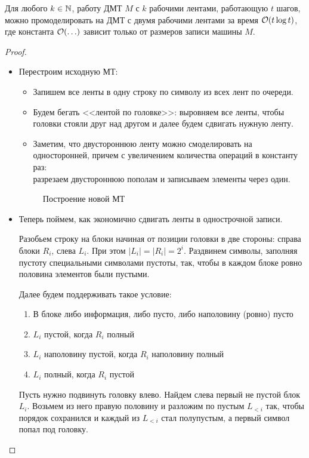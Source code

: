 \begin{thm}\label{th:two_bands}
	Для любого $ k \in \mathbb{N}$, работу ДМТ  $ M$ с $ k$ рабочими лентами, работающую $ t$ шагов, можно  промоделировать на  ДМТ с двумя рабочими лентами за время  $ \mathcal{O}(t \log t)$,
	где константа $ \mathcal{O}(\ldots) $ зависит только от размеров записи машины $ M$.
\end{thm}
\begin{proof}
	\begin{itemize}
		\item
			Перестроим исходную МТ:
			\begin{itemize}
				\item Запишем все ленты в одну строку  по символу из всех лент по очереди.
				\item  Будем бегать <<лентой по головке>>: выровняем все ленты, чтобы головки стояли друг над  другом и далее будем сдвигать нужную ленту.
				\item Заметим, что двустороннюю ленту можно смоделировать на односторонней, причем
				с увеличением количества операций в константу раз: \\
				разрезаем двустороннюю пополам и записываем элементы через один.
			\end{itemize}
			\begin{figure}[ht]
				\centering
				\caption{Построение новой МТ}
				\label{fig:two-bands}
			\end{figure}
		\item
			Теперь поймем, как экономично сдвигать ленты в однострочной записи.

			Разобьем строку на блоки начиная от позиции головки в две стороны: справа блоки $ R_i$, слева $ L_i$. При этом $ \lvert L_i \rvert = \lvert R_i \rvert  = 2^{i}$. Раздвинем символы, заполняя пустоту специальными символами пустоты, так, чтобы в каждом блоке ровно половина элементов были пустыми.

			Далее будем поддерживать такое условие:
			\begin{enumerate}[noitemsep]
				\item В блоке либо информация, либо пусто, либо наполовину (ровно) пусто
				\item $ L_i$ пустой, когда  $ R_i$ полный
				\item  $ L_i$ наполовину пустой, когда $ R_i$ наполовину полный
				\item $ L_i$ полный, когда $ R_i$ пустой
			\end{enumerate}

			Пусть нужно подвинуть головку влево. Найдем слева первый не пустой блок $ L_i$. Возьмем из него правую половину и разложим по пустым $ L_{<i}$ так, чтобы порядок сохранился и каждый из $ L_{<i}$ стал полупустым, а первый символ попал под головку.


\end{itemize}
\end{proof}
